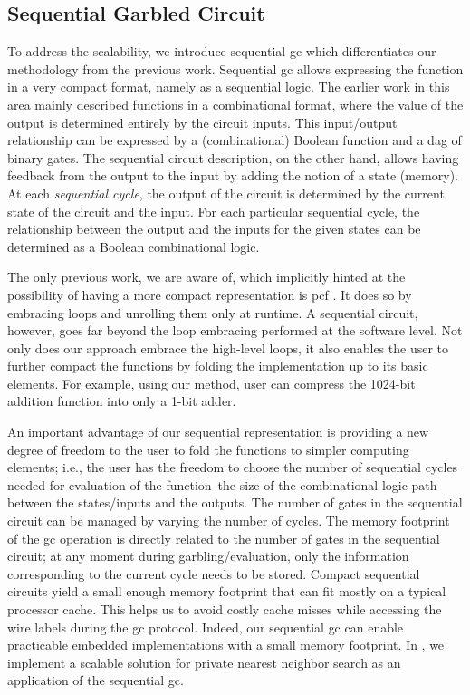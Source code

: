 \subsection{Sequential Garbled Circuit}
To address the scalability, we introduce sequential \acrfull{gc} which differentiates our methodology from the previous work.
Sequential \acrshort{gc} allows expressing the function in a very compact format, namely as a sequential logic.
The earlier work in this area mainly described functions in a combinational format, where the value of the output is determined entirely by the circuit inputs.
This input/output relationship can be expressed by a (combinational) Boolean function and a \acrfull{dag} of binary gates.
The sequential circuit description, on the other hand, allows having feedback from the output to the input by adding the notion of a state (memory).
At each \emph{sequential cycle}, the output of the circuit is determined by the current state of the circuit and the input.
For each particular sequential cycle, the relationship between the output and the inputs for the given states can be determined as a Boolean combinational logic.

The only previous work, we are aware of, which implicitly hinted at the possibility of having a more compact representation is \gls{pcf} \cite{kreuter2013pcf}.
It does so by embracing loops and unrolling them only at runtime.
A sequential circuit, however, goes far beyond the loop embracing performed at the software level.
Not only does our approach embrace the high-level loops, it also enables the user to further compact the functions by folding the implementation up to its basic elements.
For example, using our method, user can compress the 1024-bit addition function into only a 1-bit adder.

An important advantage of our sequential representation is providing a new degree of freedom to the user to fold the functions to simpler computing elements; i.e., the user has the freedom to choose the number of sequential cycles needed for evaluation of the function--the size of the combinational logic path between the states/inputs and the outputs.
The number of gates in the sequential circuit can be managed by varying the number of cycles.
The memory footprint of the \acrshort{gc} operation is directly related to the number of gates in the sequential circuit; at any moment during garbling/evaluation, only the information corresponding to the current cycle needs to be stored.
Compact sequential circuits yield a small enough memory footprint that can fit mostly on a typical processor cache.
This helps us to avoid costly cache misses while accessing the wire labels during the \acrshort{gc} protocol.
Indeed, our sequential \acrshort{gc} can enable practicable embedded implementations with a small memory footprint.
In , we implement a scalable solution for private nearest neighbor search as an application of the sequential \acrshort{gc}.

